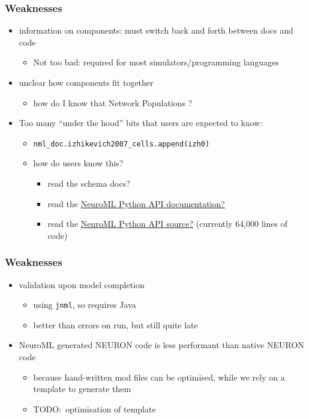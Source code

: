 \begin{frame}[t]
  \frametitle{Weaknesses}
  \begin{itemize}
    \item information on components: must switch back and forth between docs and code
      \begin{itemize}
        \item Not too bad: required for most simulators/programming languages
      \end{itemize}
      \pause{}
    \item unclear how components fit together
      \begin{itemize}
        \item how do I know that Network \textrightarrow{} Populations \textrightarrow{}?
      \end{itemize}
      \pause{}
    \item Too many \enquote{under the hood} bits that users are expected to know:
      \begin{itemize}
        \item \texttt{nml_doc.izhikevich2007_cells.append(izh0)}
        \item how do users know this?
          \begin{itemize}
            \item read the schema docs?
            \item read the \href{https://libneuroml.readthedocs.io/en/development/userdocs/coreclasses.html?highlight=neuromldocument\#neuromldocument}{NeuroML Python API documentation?} 
            \item read the \href{https://github.com/NeuralEnsemble/libNeuroML/blob/master/neuroml/nml/nml.py}{NeuroML Python API source?} (currently 64,000 lines of code)
          \end{itemize}
      \end{itemize}
  \end{itemize}
\end{frame}
\begin{frame}[t]
  \frametitle{Weaknesses}
  \begin{itemize}
    \item validation upon model completion
      \begin{itemize}
        \item using \texttt{jnml}, so requires Java
        \item better than errors on run, but still quite late
      \end{itemize}
      \pause{}
    \item NeuroML generated NEURON code is less performant than native NEURON code
      \begin{itemize}
        \item because hand-written mod files can be optimised, while we rely on a template to generate them
        \item TODO:\ optimisation of template
      \end{itemize}
  \end{itemize}
\end{frame}
